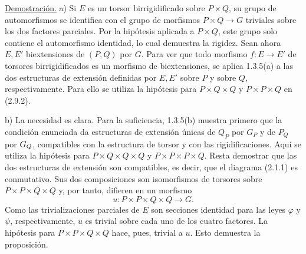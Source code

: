 \underline{Demostración.} a) Si $E$ es un torsor birrigidificado sobre
$P\times Q$, su grupo de automorfismos se identifica con el grupo de
morfismos $P\times Q\longrightarrow G$ triviales sobre los dos
factores parciales. Por la hipótesis aplicada a $P\times Q$, este grupo
solo contiene el automorfismo identidad, lo cual demuestra la rigidez.
Sean ahora $E,E'$ biextensiones de $(P,Q)$ por $G$. Para ver que todo
morfismo $f:E\longrightarrow E'$ de torsores birrigidificados es un
morfismo de biextensiones, se aplica 1.3.5(a) a las dos estructuras de
extensión definidas por $E,E'$ sobre $P$ y sobre $Q$,
respectivamente. Para ello se utiliza la hipótesis para
$P\times Q\times Q$ y $P\times P\times Q$ en (2.9.2).

\noindent
b) La necesidad es clara. Para la suficiencia, 1.3.5(b) muestra
primero que la condición enunciada da estructuras de extensión únicas
de $Q_P$ por $G_P$ y de $P_Q$ por $\sisi{G_P}{G_Q}$, compatibles con
la estructura de torsor y con las rigidificaciones. Aquí se utiliza la
hipótesis para $P\times Q\times Q\times Q$ y
$P\times P\times P\times Q$. Resta demostrar que las dos estructuras
de extensión son compatibles, es decir, que el diagrama (2.1.1) es
conmutativo. Sus dos composiciones son isomorfismos de torsores sobre
$P\times P\times Q\times Q$ y, por tanto, difieren en un morfismo
\[
 u:P\times P\times Q\times Q\longrightarrow G.
\]
Como las trivializaciones parciales de $E$ son secciones identidad
para las leyes $\varphi$ y $\psi$, respectivamente, $u$ es trivial
sobre cada uno de los cuatro factores. La hipótesis para
$P\times P\times Q\times Q$ hace, pues, trivial a $u$. Esto demuestra
la proposición.
\par\medskip
